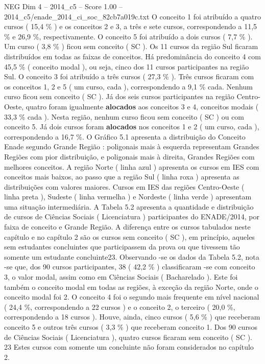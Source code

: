 \begin{textsample}{NEG Dim 4 – 2014\_c5 – Score 1.00 – 2014\_c5/enade\_2014\_ci\_soc\_82cb7a019c.txt}
O conceito 1 foi atribuído a quatro cursos ( 15,4 \% ) e os conceitos 2 e 3, a três e sete cursos, correspondendo a 11,5 \% e 26,9 \%, respectivamente.
O conceito 5 foi atribuído a dois cursos ( 7,7 \% ).
Um curso ( 3,8 \% ) ficou sem conceito ( SC ).
Os 11 cursos da região Sul ficaram distribuídos em todas as faixas de conceitos.
Há predominância do conceito 4 com 45,5 \% ( conceito modal ), ou seja, cinco dos 11 cursos participantes na região Sul.
O conceito 3 foi atribuído a três cursos ( 27,3 \% ).
Três cursos ficaram com os conceitos 1, 2 e 5 ( um curso, cada ), correspondendo a 9,1 \% cada.
Nenhum curso ficou sem conceito ( SC ).
Já dos seis cursos participantes na região Centro-Oeste, quatro foram igualmente \textbf{alocados} aos conceitos 3 e 4, conceitos modais ( 33,3 \% cada ).
Nesta região, nenhum curso ficou sem conceito ( SC ) ou com conceito 5.
Já dois cursos foram \textbf{alocados} nos conceitos 1 e 2 ( um curso, cada ), correspondendo a 16,7 \%.
O Gráfico 5.1 apresenta a distribuição do Conceito Enade segundo Grande Região : poligonais mais à esquerda representam Grandes Regiões com pior distribuição, e poligonais mais à direita, Grandes Regiões com melhores conceitos.
A região Norte ( linha azul ) apresenta os cursos em IES com conceitos mais baixos, ao passo que a região Sul ( linha roxa ) apresenta as distribuições com valores maiores.
Cursos em IES das regiões Centro-Oeste ( linha preta ), Sudeste ( linha vermelha ) e Nordeste ( linha verde ) apresentam uma situação intermediária.
A Tabela 5.2 apresenta a quantidade e distribuição de cursos de Ciências Sociais ( Licenciatura ) participantes do ENADE/2014, por faixa de conceito e Grande Região.
A diferença entre os cursos tabulados neste capítulo e no capítulo 2 são os cursos sem conceito ( SC ), em princípio, aqueles sem estudantes concluintes que participassem da prova ou que tivessem tão somente um estudante concluinte23.
Observando -se os dados da Tabela 5.2, nota -se que, dos 90 cursos participantes, 38 ( 42,2 \% ) classificaram -se com conceito 3, o valor modal, assim como em Ciências Sociais ( Bacharelado ).
Este foi também o conceito modal em todas as regiões, à exceção da região Norte, onde o conceito modal foi 2.
O conceito 4 foi o segundo mais frequente em nível nacional ( 24,4 \%, correspondendo a 22 cursos ) e o conceito 2, o terceiro ( 20,0 \%, correspondendo a 18 cursos ).
Houve, ainda, cinco cursos ( 5,6 \% ) que receberam conceito 5 e outros três cursos ( 3,3 \% ) que receberam conceito 1.
Dos 90 cursos de Ciências Sociais ( Licenciatura ), quatro cursos ficaram sem conceito ( SC ). 23 Estes cursos com somente um concluinte não foram considerados no capítulo 2.

\end{textsample}
